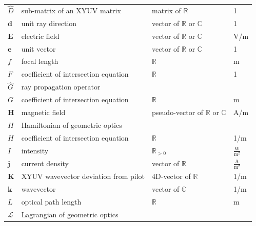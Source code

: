 \documentclass[12pt,a4paper,twoside,openright,BCOR10mm,headsepline,titlepage,abstracton,chapterprefix,final]{scrreprt}
\newcommand\Vector[1]{{\mathbf{#1}}}
\newcommand\wavenumber{k}
\newcommand\Wavevector{\Vector{\wavenumber}}
\newcommand\scalarEfield{E}
\newcommand\scalarHfield{H}
\newcommand\Efield{\Vector{\scalarEfield}}
\newcommand\Hfield{\Vector{\scalarHfield}}
\newcommand\currentdensity{\Vector{j}}
\newcommand\meter{\textrm{m}}
\newcommand\ampere{\textrm{A}}
\newcommand\volt{\textrm{V}}
\newcommand\watt{\textrm{W}}
\begin{document}
\begin{tabular}{l|l|l|l}
 $\hat{D}$ & sub-matrix of an XYUV matrix & matrix of $\mathbb{R}$ & 1\\
 $\Vector{d}$ & unit ray direction & vector of $\mathbb{R}$ or $\mathbb{C}$ & 1\\
 \hline
 $\Efield$ & electric field & vector of $\mathbb{R}$ or $\mathbb{C}$ & \volt /\meter \\
 $\Vector{e}$ & unit vector & vector of $\mathbb{R}$ or $\mathbb{C}$ & 1\\
 \hline
 $f$ & focal length & $\mathbb{R}$ & \meter \\
 $F$ & coefficient of intersection equation & $\mathbb{R}$ & 1\\
 \hline
 $\hat{G}$ & ray propagation operator &&\\
 $G$ & coefficient of intersection equation & $\mathbb{R}$ & \meter\\
 \hline
 $\Hfield$ & magnetic field & pseudo-vector of $\mathbb{R}$ or $\mathbb{C}$ & \ampere /\meter \\
 $H$ & Hamiltonian of geometric optics && \\
 $H$ & coefficient of intersection equation & $\mathbb{R}$ & 1/\meter \\
 \hline
 $I$ & intensity & $\mathbb{R}_{>0}$ & $\frac{\watt}{\meter^2}$ \\
 \hline
 $\currentdensity$ & current density & vector of $\mathbb{R}$ & $\frac{\ampere}{\meter^2}$ \\
 \hline
 $\Vector{K}$ & XYUV wavevector deviation from pilot & 4D-vector of $\mathbb{R}$ & 1/\meter \\
 $\Wavevector$ & wavevector & vector of $\mathbb{C}$ & 1/\meter \\
 \hline
 $L$ & optical path length & $\mathbb{R}$ & \meter \\
 $\mathcal{L}$ & Lagrangian of geometric optics &&\\
\end{tabular}\\
\end{document}
